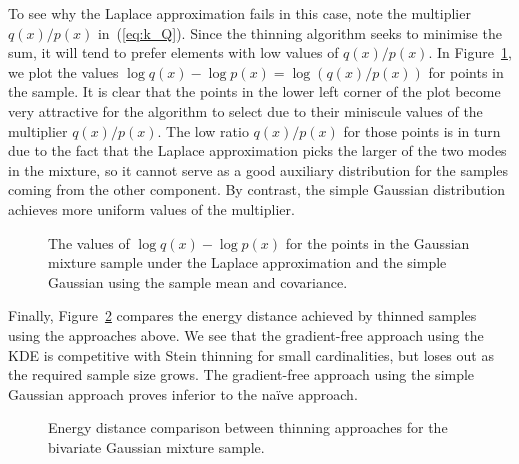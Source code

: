 \documentclass[11pt,a4paper]{report}
\begin{document}
To see why the Laplace approximation fails in this case, note the multiplier $q(x) / p(x)$ in~(\ref{eq:k_Q}). Since the thinning algorithm seeks to minimise the sum, it will tend to prefer elements with low values of $q(x) / p(x)$. In Figure~\ref{fig:gmm:laplace-failure}, we plot the values $\log q(x) - \log p(x) = \log (q(x) / p(x))$ for points in the sample. It is clear that the points in the lower left corner of the plot become very attractive for the algorithm to select due to their miniscule values of the multiplier $q(x) / p(x)$. The low ratio $q(x) / p(x)$ for those points is in turn due to the fact that the Laplace approximation picks the larger of the two modes in the mixture, so it cannot serve as a good auxiliary distribution for the samples coming from the other component. By contrast, the simple Gaussian distribution achieves more uniform values of the multiplier.

\begin{figure}[h]
\centering
{}
\caption{The values of $\log q(x) - \log p(x)$ for the points in the Gaussian mixture sample under the Laplace approximation and the simple Gaussian using the sample mean and covariance.
\label{fig:gmm:laplace-failure}}
\end{figure}

Finally, Figure~\ref{fig:gmm:comparison} compares the energy distance achieved by thinned samples using the approaches above. We see that the gradient-free approach using the KDE is competitive with Stein thinning for small cardinalities, but loses out as the required sample size grows. The gradient-free approach using the simple Gaussian approach proves inferior to the na\"ive approach.

\begin{figure}[h]
\centering
{}
\caption{Energy distance comparison between thinning approaches for the bivariate Gaussian mixture sample.
\label{fig:gmm:comparison}}
\end{figure}
\end{document}
